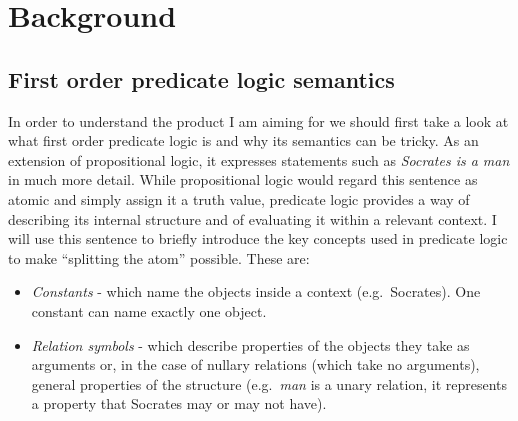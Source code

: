 \documentclass{report}
\begin{document}

\chapter{Background}

\section{First order predicate logic semantics}
In order to understand the product I am aiming for we should first take a look 
at what first order predicate logic is and why its semantics can be tricky. As 
an extension of propositional logic, it expresses statements such as \emph{
Socrates is a man} in much more detail. While propositional logic would regard 
this sentence as atomic and simply assign it a truth value, predicate logic 
provides a way of describing its internal structure and of evaluating it within 
a relevant context. I will use this sentence to briefly introduce the key 
concepts used in predicate logic to make ``splitting the atom'' possible. 
These are:

  \begin{itemize}
  \item \emph{Constants} 
  - which name the objects inside a context (e.g.\ Socrates). One constant can 
  name exactly one object.
	\item \emph{Relation symbols}
  - which describe properties of the objects they take as arguments or, in the
  case of nullary relations (which take no arguments), general properties of the
  structure (e.g.\ \emph{man} is a unary relation, it represents a property that 
  Socrates may or may not have).
  \end{itemize}
\end{document}
